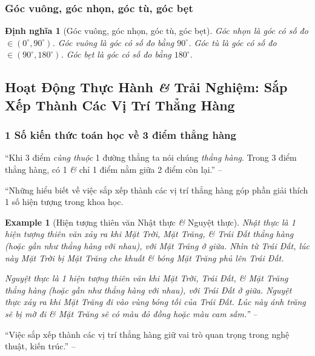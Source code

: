 \documentclass{article}
\numberwithin{equation}{section}
\newtheorem{dinhnghia}{Định nghĩa}[section]
\newtheorem{example}{Example}[section]
\begin{document}
\subsubsection{Góc vuông, góc nhọn, góc tù, góc bẹt}

\begin{dinhnghia}[Góc vuông, góc nhọn, góc tù, góc bẹt]
	\emph{Góc nhọn} là góc có số đo $\in(0^\circ,90^\circ)$. \emph{Góc vuông} là góc có số đo bằng $90^\circ$. \emph{Góc tù} là góc có số đo $\in(90^\circ,180^\circ)$. \emph{Góc bẹt} là góc có số đo bằng $180^\circ$.
\end{dinhnghia}


\subsection{Hoạt Động Thực Hành \textit{\&} Trải Nghiệm: Sắp Xếp Thành Các Vị Trí Thẳng Hàng}

\subsubsection{1 Số kiến thức toán học về 3 điểm thẳng hàng}
``Khi 3 điểm \textit{cùng thuộc} 1 đường thẳng ta nói chúng \textit{thẳng hàng}. Trong 3 điểm thẳng hàng, có 1 \textit{\&} chỉ 1 điểm nằm giữa 2 điểm còn lại.'' -- \cite[p. 104]{SGK_Toan_6_Canh_Dieu_tap_2}

``Những hiểu biết về việc sắp xếp thành các vị trí thẳng hàng góp phần giải thích 1 số hiện tượng trong khoa học.

\begin{example}[Hiện tượng thiên văn Nhật thực \textit{\&} Nguyệt thực]
	\emph{Nhật thực} là 1 hiện tượng thiên văn xảy ra khi Mặt Trời, Mặt Trăng, \textit{\&} Trái Đất thẳng hàng (hoặc gần như thẳng hàng với nhau), với Mặt Trăng ở giữa. Nhìn từ Trái Đất, lúc này Mặt Trời bị Mặt Trăng che khuất \textit{\&} bóng Mặt Trăng phủ lên Trái Đất.
	
	\emph{Nguyệt thực} là 1 hiện tượng thiên văn khi Mặt Trời, Trái Đất, \textit{\&} Mặt Trăng thẳng hàng (hoặc gần như thẳng hàng với nhau), với Trái Đất ở giữa. Nguyệt thực xảy ra khi Mặt Trăng đi vào vùng bóng tối của Trái Đất. Lúc này ánh trăng sẽ bị mờ đi \textit{\&} Mặt Trăng sẽ có màu đỏ đồng hoặc màu cam sẫm.'' -- \cite[p. 105]{SGK_Toan_6_Canh_Dieu_tap_2}
\end{example}
``Việc sắp xếp thành các vị trí thẳng hàng giữ vai trò quan trọng trong nghệ thuật, kiến trúc.'' -- \cite[p. 106]{SGK_Toan_6_Canh_Dieu_tap_2}
\end{document}
